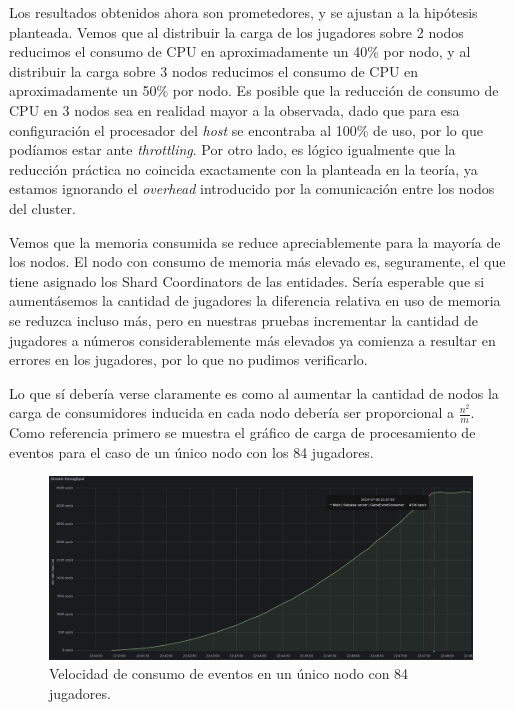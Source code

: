 Los resultados obtenidos ahora son prometedores, y se ajustan a la hipótesis planteada. Vemos que al distribuir la carga de los jugadores
sobre 2 nodos reducimos el consumo de CPU en aproximadamente un 40\% por nodo, y al distribuir la carga sobre 3 nodos reducimos el consumo de CPU en aproximadamente un 50\% por nodo.
Es posible que la reducción de consumo de CPU en 3 nodos sea en realidad mayor a la observada, dado que para esa configuración el procesador del \textit{host} se encontraba al 100\% de uso,
por lo que podíamos estar ante \textit{throttling}. Por otro lado, es lógico igualmente que la reducción práctica no coincida exactamente con la planteada en la teoría, ya estamos ignorando el \textit{overhead} introducido por la comunicación entre los nodos del cluster.

Vemos que la memoria consumida se reduce apreciablemente para la mayoría de los nodos. El nodo con consumo de memoria más elevado es, seguramente, el que tiene
asignado los Shard Coordinators de las entidades. Sería esperable que si aumentásemos la cantidad de jugadores la diferencia relativa en uso de memoria se reduzca incluso más, pero en nuestras pruebas
incrementar la cantidad de jugadores a números considerablemente más elevados ya comienza a resultar en errores en los jugadores, por lo que no pudimos verificarlo.

Lo que sí debería verse claramente es como al aumentar la cantidad de nodos la carga de consumidores inducida en cada nodo debería ser proporcional a $\frac{n^2}{m}$.
Como referencia primero se muestra el gráfico de carga de procesamiento de eventos para el caso de un único nodo con los 84 jugadores.

\begin{figure}[htbp]
    \centering
    \includegraphics[width=1\textwidth]{../assets/fiubakka-consumer-single-node-metrics.png}
    \caption{Velocidad de consumo de eventos en un único nodo con 84 jugadores.}
\end{figure}

